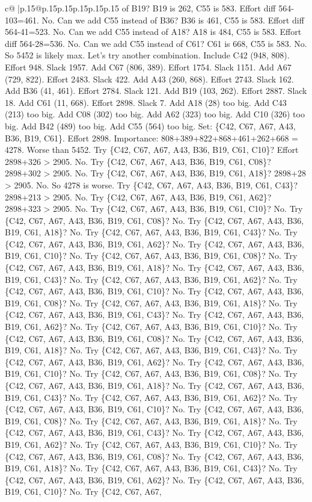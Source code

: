 \documentclass{article}
\begin{document}
{\begin{supertabular}{c@{$\;$}|p{.15\linewidth}@{}p{.15\linewidth}p{.15\linewidth}p{.15\linewidth}p{.15\linewidth}p{.15\linewidth}}
{{{of B19? B19 is 262, C55 is 583. Effort diff 564{-}103=461. No. Can we add C55 instead of B36? B36 is 461, C55 is 583. Effort diff 564{-}41=523. No. Can we add C55 instead of A18? A18 is 484, C55 is 583. Effort diff 564{-}28=536. No. Can we add C55 instead of C61? C61 is 668, C55 is 583. No. So 5452 is likely max. Let's try another combination. Include C42 (948, 808). Effort 948. Slack 1957. Add C67 (806, 389). Effort 1754. Slack 1151. Add A67 (729, 822). Effort 2483. Slack 422. Add A43 (260, 868). Effort 2743. Slack 162. Add B36 (41, 461). Effort 2784. Slack 121. Add B19 (103, 262). Effort 2887. Slack 18. Add C61 (11, 668). Effort 2898. Slack 7. Add A18 (28) too big. Add C43 (213) too big. Add C08 (302) too big. Add A62 (323) too big. Add C10 (326) too big. Add B42 (489) too big. Add C55 (564) too big. Set: \{C42, C67, A67, A43, B36, B19, C61\}. Effort 2898. Importance: 808+389+822+868+461+262+668 = 4278. Worse than 5452. Try \{C42, C67, A67, A43, B36, B19, C61, C10\}? Effort 2898+326 > 2905. No. Try \{C42, C67, A67, A43, B36, B19, C61, C08\}? 2898+302 > 2905. No. Try \{C42, C67, A67, A43, B36, B19, C61, A18\}? 2898+28 > 2905. No. So 4278 is worse. Try \{C42, C67, A67, A43, B36, B19, C61, C43\}? 2898+213 > 2905. No. Try \{C42, C67, A67, A43, B36, B19, C61, A62\}? 2898+323 > 2905. No. Try \{C42, C67, A67, A43, B36, B19, C61, C10\}? No. Try \{C42, C67, A67, A43, B36, B19, C61, C08\}? No. Try \{C42, C67, A67, A43, B36, B19, C61, A18\}? No. Try \{C42, C67, A67, A43, B36, B19, C61, C43\}? No. Try \{C42, C67, A67, A43, B36, B19, C61, A62\}? No. Try \{C42, C67, A67, A43, B36, B19, C61, C10\}? No. Try \{C42, C67, A67, A43, B36, B19, C61, C08\}? No. Try \{C42, C67, A67, A43, B36, B19, C61, A18\}? No. Try \{C42, C67, A67, A43, B36, B19, C61, C43\}? No. Try \{C42, C67, A67, A43, B36, B19, C61, A62\}? No. Try \{C42, C67, A67, A43, B36, B19, C61, C10\}? No. Try \{C42, C67, A67, A43, B36, B19, C61, C08\}? No. Try \{C42, C67, A67, A43, B36, B19, C61, A18\}? No. Try \{C42, C67, A67, A43, B36, B19, C61, C43\}? No. Try \{C42, C67, A67, A43, B36, B19, C61, A62\}? No. Try \{C42, C67, A67, A43, B36, B19, C61, C10\}? No. Try \{C42, C67, A67, A43, B36, B19, C61, C08\}? No. Try \{C42, C67, A67, A43, B36, B19, C61, A18\}? No. Try \{C42, C67, A67, A43, B36, B19, C61, C43\}? No. Try \{C42, C67, A67, A43, B36, B19, C61, A62\}? No. Try \{C42, C67, A67, A43, B36, B19, C61, C10\}? No. Try \{C42, C67, A67, A43, B36, B19, C61, C08\}? No. Try \{C42, C67, A67, A43, B36, B19, C61, A18\}? No. Try \{C42, C67, A67, A43, B36, B19, C61, C43\}? No. Try \{C42, C67, A67, A43, B36, B19, C61, A62\}? No. Try \{C42, C67, A67, A43, B36, B19, C61, C10\}? No. Try \{C42, C67, A67, A43, B36, B19, C61, C08\}? No. Try \{C42, C67, A67, A43, B36, B19, C61, A18\}? No. Try \{C42, C67, A67, A43, B36, B19, C61, C43\}? No. Try \{C42, C67, A67, A43, B36, B19, C61, A62\}? No. Try \{C42, C67, A67, A43, B36, B19, C61, C10\}? No. Try \{C42, C67, A67, A43, B36, B19, C61, C08\}? No. Try \{C42, C67, A67, A43, B36, B19, C61, A18\}? No. Try \{C42, C67, A67, A43, B36, B19, C61, C43\}? No. Try \{C42, C67, A67, A43, B36, B19, C61, A62\}? No. Try \{C42, C67, A67, A43, B36, B19, C61, C10\}? No. Try \{C42, C67, A67, }}}
\end{supertabular}}
\end{document}
